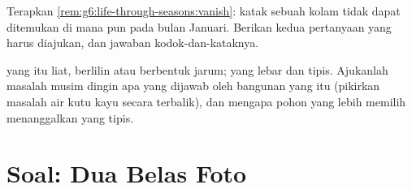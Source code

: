 \begin{exercise}[$\star\star$]\label{exo:g6:life-through-seasons:11}
Terapkan \cref{rem:g6:life-through-seasons:vanish}: katak sebuah kolam
tidak dapat ditemukan di mana pun pada bulan Januari. Berikan kedua
pertanyaan yang harus diajukan, dan jawaban kodok-dan-kataknya.
\end{exercise}

\begin{exercise}[$\star\star\star$]\label{exo:g6:life-through-seasons:12}
 yang  itu liat, berlilin atau berbentuk jarum; 
yang  lebar dan tipis. Ajukanlah masalah musim dingin apa
yang dijawab oleh bangunan  yang  itu (pikirkan
masalah air kutu kayu secara terbalik), dan mengapa pohon yang
 lebih memilih menanggalkan  yang tipis.
\end{exercise}

\section{Soal: Dua Belas Foto}

